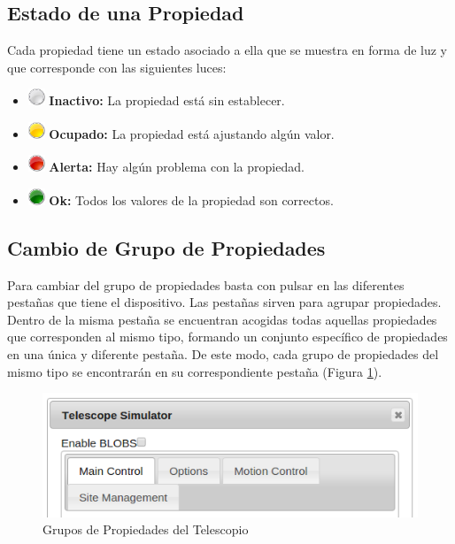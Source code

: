 \subsection{Estado de una Propiedad}
Cada propiedad tiene un estado asociado a ella que se muestra en forma de luz y que corresponde con las siguientes luces:
\begin{itemize}
  \item \includegraphics[width=0.5cm]{./imagenes/grey_light} \textbf{Inactivo:} La propiedad está sin establecer.
  \item \includegraphics[width=0.5cm]{./imagenes/yellow_light} \textbf{Ocupado:} La propiedad está ajustando algún valor.
  \item \includegraphics[width=0.5cm]{./imagenes/red_light} \textbf{Alerta:} Hay algún problema con la propiedad.
  \item \includegraphics[width=0.5cm]{./imagenes/green_light} \textbf{Ok:} Todos los valores de la propiedad son correctos.
\end{itemize}

\subsection{Cambio de Grupo de Propiedades}
Para cambiar del grupo de propiedades basta con pulsar en las diferentes pestañas que tiene el dispositivo. Las pestañas sirven para agrupar propiedades. Dentro de la misma pestaña se encuentran acogidas todas aquellas propiedades que corresponden al mismo tipo, formando un conjunto específico de propiedades en una única y diferente pestaña. De este modo, cada grupo de propiedades del mismo tipo se encontrarán en su correspondiente pestaña (Figura \ref{fig:gruposPropiedades}).
\begin{figure}[htb]
\centering
\includegraphics[width=1\textwidth]{./imagenes/capturaGrupos}
\caption{Grupos de Propiedades del Telescopio} \label{fig:gruposPropiedades}
\end{figure}

